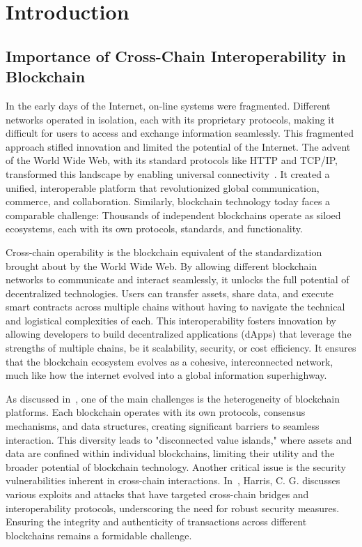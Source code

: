 \setcounter{page}{1} %

\section{Introduction} %

\subsection{Importance of Cross-Chain Interoperability in Blockchain} 

In the early days of the Internet, on-line systems were fragmented. Different networks operated in isolation, each with its proprietary protocols, making it difficult for users to access and exchange information seamlessly. This fragmented approach stifled innovation and limited the potential of the Internet. The advent of the World Wide Web, with its standard protocols like HTTP and TCP/IP, transformed this landscape by enabling universal connectivity~\cite{www}. It created a unified, interoperable platform that revolutionized global communication, commerce, and collaboration. Similarly, blockchain technology today faces a comparable challenge: Thousands of independent blockchains operate as siloed ecosystems, each with its own protocols, standards, and functionality.

Cross-chain operability is the blockchain equivalent of the standardization brought about by the World Wide Web. By allowing different blockchain networks to communicate and interact seamlessly, it unlocks the full potential of decentralized technologies. Users can transfer assets, share data, and execute smart contracts across multiple chains without having to navigate the technical and logistical complexities of each. This interoperability fosters innovation by allowing developers to build decentralized applications (dApps) that leverage the strengths of multiple chains, be it scalability, security, or cost efficiency. It ensures that the blockchain ecosystem evolves as a cohesive, interconnected network, much like how the internet evolved into a global information superhighway.

As discussed in~\cite{crosschain}, one of the main challenges is the heterogeneity of blockchain platforms. Each blockchain operates with its own protocols, consensus mechanisms, and data structures, creating significant barriers to seamless interaction. This diversity leads to "disconnected value islands," where assets and data are confined within individual blockchains, limiting their utility and the broader potential of blockchain technology. Another critical issue is the security vulnerabilities inherent in cross-chain interactions. In~\cite{crosschain}, Harris, C. G. discusses various exploits and attacks that have targeted cross-chain bridges and interoperability protocols, underscoring the need for robust security measures. Ensuring the integrity and authenticity of transactions across different blockchains remains a formidable challenge. 

